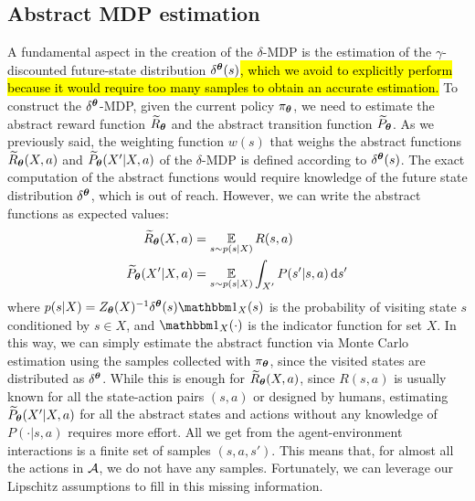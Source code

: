 \subsection{Abstract MDP estimation}\label{sec:mdpest}
A fundamental aspect in the creation of the $\delta$-\ac{MDP} is the estimation of the $\gamma$-discounted future-state distribution $\delta^{\boldsymbol{\theta}}(s)$\hl{, which we avoid to explicitly perform because it would require too many samples to obtain an accurate estimation.}
To construct the $\delta^{\boldsymbol{\theta}}$-\ac{MDP}, given the current policy $\pi_{\boldsymbol{\theta}}$, we need to estimate the abstract reward function $\widetilde{R}_{\boldsymbol{\theta}}$ and the abstract transition function $\widetilde{P}_{\boldsymbol{\theta}}$. As we previously said, the weighting function $w(s)$ that weighs the abstract functions $\widetilde{R}_{\boldsymbol{\theta}}(X, a)$ and $\widetilde{P}_{\boldsymbol{\theta}}(X'|X, a)$ of the $\delta$-\ac{MDP} is defined according to $\delta^{\boldsymbol{\theta}}(s)$. The exact computation of the abstract functions would require knowledge of the future state distribution $\delta^{\boldsymbol{\theta}}$, which is out of reach. 
However, we can write the abstract functions as expected values:
\begin{align}
\widetilde{R}_{\boldsymbol{\theta}}(X, a) &= \operatorname*{\mathbb{E}}_{s \sim p(s | X)} R(s, a) \label{eq:mcr}\\
\widetilde{P}_{\boldsymbol{\theta}}(X' | X, a) &= \operatorname*{\mathbb{E}}_{s \sim p(s | X)} \int_{X'} P(s' | s, a) \,\mathrm{d} s'\label{eq:mcp}
\end{align}
where $p(s | X) = Z_{\vtheta}(X)^{-1}\delta^{\vtheta}(s)\Ind_X(s)$ is the probability of visiting state $s$ conditioned by $s\in X$, and $\Ind_X(\cdot)$ is the indicator function for set $X$.
In this way, we can simply estimate the abstract function via Monte Carlo estimation using the samples collected with $\pi_{\boldsymbol{\theta}}$, since the visited states are distributed as $\delta^{\boldsymbol{\theta}}$.
While this is enough for $\widetilde{R}_{\boldsymbol{\theta}}(X, a)$, since $R(s, a)$ is usually known for all the state-action pairs $(s,a)$ or designed by humans, estimating $\widetilde{P}_{\boldsymbol{\theta}}(X'|X, a)$ for all the abstract states and actions without any knowledge of $P(\cdot|s, a)$ requires more effort. All we get from the agent-environment interactions is a finite set of samples $(s,a,s')$. This means that, for almost all the actions in $\mathcal{A}$, we do not have any samples. Fortunately, we can leverage our Lipschitz assumptions to fill in this missing information.\\
